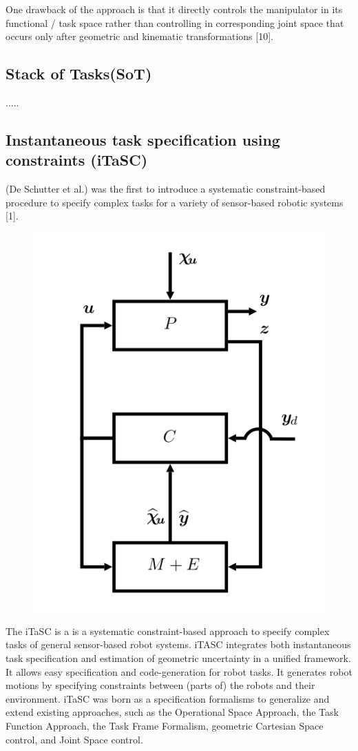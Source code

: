 {One drawback of the approach is that it directly controls the manipulator in its functional / task space rather than controlling in corresponding joint space that occurs only after geometric and kinematic transformations [10].

\subsection{Stack of Tasks(SoT)}{.....}

\subsection{Instantaneous task specification using constraints (iTaSC)}
(De Schutter et al.) was the first to introduce a systematic constraint-based procedure to specify complex tasks for a variety of sensor-based robotic systems [1].

\begin{figure}[h!]
	\centering
	\includegraphics[scale=0.5]{images/General-control-scheme.png}
\end{figure}
The iTaSC is a is a systematic constraint-based approach to specify complex tasks of general sensor-based robot systems. iTASC integrates both instantaneous task specification and estimation of geometric uncertainty in a unified framework. It allows easy specification and code-generation for robot tasks. It generates robot motions by specifying constraints between (parts of) the robots and their environment. iTaSC was born as a specification formalisms to generalize and extend existing approaches, such as the Operational Space Approach, the Task Function Approach, the Task Frame Formalism, geometric Cartesian Space control, and Joint Space control.

}

